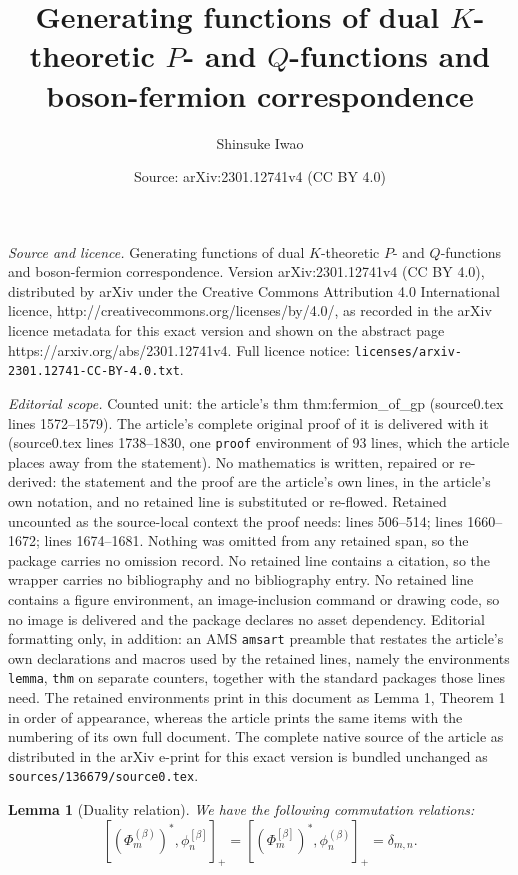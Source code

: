 \documentclass[10pt,a4paper]{amsart}
\title{Generating functions of dual $K$-theoretic $P$- and $Q$-functions and boson-fermion correspondence}
\author{Shinsuke Iwao}
\date{Source: arXiv:2301.12741v4 (CC BY 4.0)}
\newtheorem{lemma}{Lemma}
\begin{document}
\maketitle

\noindent\emph{Source and licence.} Generating functions of dual $K$-theoretic $P$- and $Q$-functions and boson-fermion correspondence. Version arXiv:2301.12741v4 (CC BY 4.0), distributed by arXiv under the Creative Commons Attribution 4.0 International licence, http://creativecommons.org/licenses/by/4.0/, as recorded in the arXiv licence metadata for this exact version and shown on the abstract page https://arxiv.org/abs/2301.12741v4. Full licence notice: \texttt{licenses/arxiv-2301.12741-CC-BY-4.0.txt}.\par\smallskip

\noindent\textit{Editorial scope.} Counted unit: the article's thm thm:fermion\_of\_gp (source0.tex lines 1572--1579). The article's complete original proof of it is delivered with it (source0.tex lines 1738--1830, one \texttt{proof} environment of 93 lines, which the article places away from the statement). No mathematics is written, repaired or re-derived: the statement and the proof are the article's own lines, in the article's own notation, and no retained line is substituted or re-flowed.  Retained uncounted as the source-local context the proof needs: lines 506--514; lines 1660--1672; lines 1674--1681.  Nothing was omitted from any retained span, so the package carries no omission record.  No retained line contains a citation, so the wrapper carries no bibliography and no bibliography entry.  No retained line contains a figure environment, an image-inclusion command or drawing code, so no image is delivered and the package declares no asset dependency.  Editorial formatting only, in addition: an AMS \texttt{amsart} preamble that restates the article's own declarations and macros used by the retained lines, namely the environments \texttt{lemma}, \texttt{thm} on separate counters, together with the standard packages those lines need.  The retained environments print in this document as Lemma 1, Theorem 1 in order of appearance, whereas the article prints the same items with the numbering of its own full document.  The complete native source of the article as distributed in the arXiv e-print for this exact version is bundled unchanged as \texttt{sources/136679/source0.tex}.
\begin{lemma}[Duality relation]
\label{lemma:duality}
We have the following commutation relations:
\[
[(\Phi^{(\beta)}_m)^\ast, \phi^{[\beta]}_n]_+
=[(\Phi^{[\beta]}_m)^\ast, \phi^{(\beta)}_n]_+
=\delta_{m,n}.
\]
\end{lemma}
\end{document}

